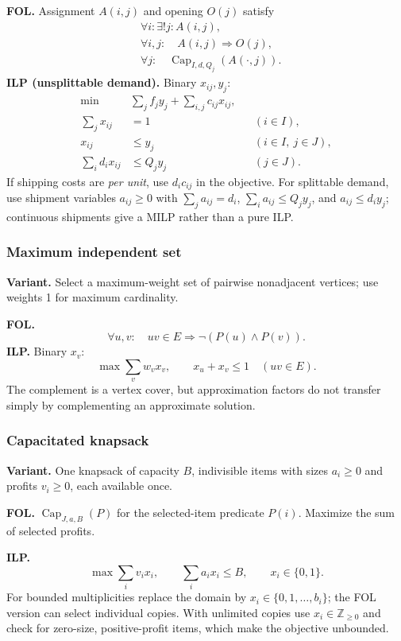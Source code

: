 \textbf{FOL.} Assignment $A(i,j)$ and opening $O(j)$ satisfy
\[
\begin{aligned}
 &\forall i:\exists!j:A(i,j),\\
 &\forall i,j:\quad A(i,j)\Rightarrow O(j),\\
 &\forall j:\quad\operatorname{Cap}_{I,d,Q_j}(A(\cdot,j)).
\end{aligned}
\]
\textbf{ILP (unsplittable demand).} Binary $x_{ij},y_j$:
\[
\begin{aligned}
 \min\quad &\sum_jf_jy_j+\sum_{i,j}c_{ij}x_{ij},\\
 \sum_jx_{ij}&=1 &&(i\in I),\\
 x_{ij}&\le y_j &&(i\in I,\ j\in J),\\
 \sum_i d_ix_{ij}&\le Q_jy_j &&(j\in J).
\end{aligned}
\]
If shipping costs are \emph{per unit}, use $d_ic_{ij}$ in the objective.
For splittable demand, use shipment variables $a_{ij}\ge0$ with
$\sum_ja_{ij}=d_i$, $\sum_ia_{ij}\le Q_jy_j$, and $a_{ij}\le d_iy_j$;
continuous shipments give a MILP rather than a pure ILP.

\subsubsection{Maximum independent set}\label{form:independent}
\textbf{Variant.} Select a maximum-weight set of pairwise nonadjacent
vertices; use weights 1 for maximum cardinality.

\textbf{FOL.}
\[
 \forall u,v:\quad uv\in E\Rightarrow\neg(P(u)\land P(v)).
\]
\textbf{ILP.} Binary $x_v$:
\[
 \max\sum_vw_vx_v,\qquad x_u+x_v\le1\quad(uv\in E).
\]
The complement is a vertex cover, but approximation factors do not
transfer simply by complementing an approximate solution.

\subsubsection{Capacitated knapsack}\label{form:knapsack}
\textbf{Variant.} One knapsack of capacity $B$, indivisible items with
sizes $a_i\ge0$ and profits $v_i\ge0$, each available once.

\textbf{FOL.} $\operatorname{Cap}_{J,a,B}(P)$ for the selected-item predicate
$P(i)$. Maximize the sum of selected profits.

\textbf{ILP.}
\[
 \max\sum_i v_ix_i,\qquad
 \sum_i a_ix_i\le B,\qquad x_i\in\{0,1\}.
\]
For bounded multiplicities replace the domain by
$x_i\in\{0,1,\ldots,b_i\}$; the FOL version can select individual copies.
With unlimited copies use $x_i\in\mathbb Z_{\ge0}$ and check for
zero-size, positive-profit items, which make the objective unbounded.

